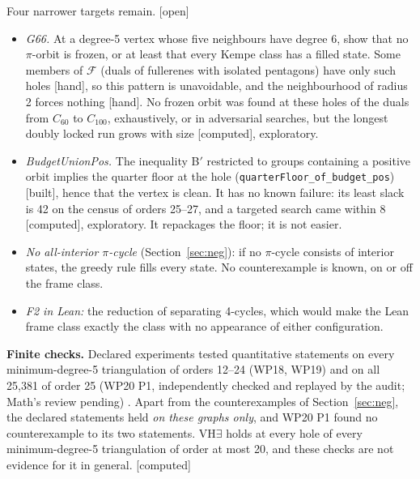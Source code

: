 \documentclass[11pt]{article}
\newcommand{\lab}[1]{\textsf{[#1]}}
\begin{document}
Four narrower targets remain. \lab{open}
\begin{itemize}
\item \emph{G66.} At a degree-5 vertex whose five neighbours have degree 6, show that no $\pi$-orbit is frozen, or at least that every Kempe class has a filled state. Some members of $\mathcal F$ (duals of fullerenes with isolated pentagons) have only such holes \lab{hand}, so this pattern is unavoidable, and the neighbourhood of radius 2 forces nothing \lab{hand}. No frozen orbit was found at these holes of the duals from $C_{60}$ to $C_{100}$, exhaustively, or in adversarial searches, but the longest doubly locked run grows with size \lab{computed}, exploratory.
\item \emph{BudgetUnionPos.} The inequality B$'$ restricted to groups containing a positive orbit implies the quarter floor at the hole (\texttt{quarterFloor\_of\_budget\_pos}) \lab{built}, hence that the vertex is clean. It has no known failure: its least slack is 42 on the census of orders 25--27, and a targeted search came within 8 \lab{computed}, exploratory. It repackages the floor; it is not easier.
\item \emph{No all-interior $\pi$-cycle} (Section~\ref{sec:neg}): if no $\pi$-cycle consists of interior states, the greedy rule fills every state. No counterexample is known, on or off the frame class.
\item \emph{F2 in Lean:} the reduction of separating 4-cycles, which would make the Lean frame class exactly the class with no appearance of either configuration.
\end{itemize}

\textbf{Finite checks.} Declared experiments tested quantitative statements on every minimum-degree-5 triangulation of orders 12--24 (WP18, WP19) and on all 25,381 of order 25 (WP20 P1, independently checked and replayed by the audit; Math's review pending)
. Apart from the counterexamples of Section~\ref{sec:neg}, the declared statements held \emph{on these graphs only}, and WP20 P1 found no counterexample to its two statements. VH$\exists$ holds at every hole of every minimum-degree-5 triangulation of order at most 20, and these checks are not evidence for it in general. \lab{computed}
\end{document}
